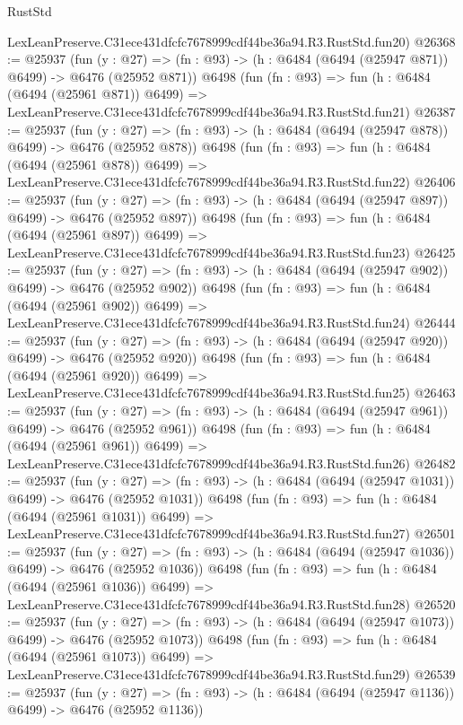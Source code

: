 \begin{lexlean}{RustStd}
\begin{coremodule}
    LexLeanPreserve.C31ece431dfcfc7678999cdf44be36a94.R3.RustStd.fun20)
@26368 := @25937
    (fun (y : @27) => (fn : @93) -> (h : @6484 (@6494 (@25947 @871)) @6499) -> @6476 (@25952 @871))
    @6498
    (fun (fn : @93) =>
    fun (h : @6484 (@6494 (@25961 @871)) @6499) =>
    LexLeanPreserve.C31ece431dfcfc7678999cdf44be36a94.R3.RustStd.fun21)
@26387 := @25937
    (fun (y : @27) => (fn : @93) -> (h : @6484 (@6494 (@25947 @878)) @6499) -> @6476 (@25952 @878))
    @6498
    (fun (fn : @93) =>
    fun (h : @6484 (@6494 (@25961 @878)) @6499) =>
    LexLeanPreserve.C31ece431dfcfc7678999cdf44be36a94.R3.RustStd.fun22)
@26406 := @25937
    (fun (y : @27) => (fn : @93) -> (h : @6484 (@6494 (@25947 @897)) @6499) -> @6476 (@25952 @897))
    @6498
    (fun (fn : @93) =>
    fun (h : @6484 (@6494 (@25961 @897)) @6499) =>
    LexLeanPreserve.C31ece431dfcfc7678999cdf44be36a94.R3.RustStd.fun23)
@26425 := @25937
    (fun (y : @27) => (fn : @93) -> (h : @6484 (@6494 (@25947 @902)) @6499) -> @6476 (@25952 @902))
    @6498
    (fun (fn : @93) =>
    fun (h : @6484 (@6494 (@25961 @902)) @6499) =>
    LexLeanPreserve.C31ece431dfcfc7678999cdf44be36a94.R3.RustStd.fun24)
@26444 := @25937
    (fun (y : @27) => (fn : @93) -> (h : @6484 (@6494 (@25947 @920)) @6499) -> @6476 (@25952 @920))
    @6498
    (fun (fn : @93) =>
    fun (h : @6484 (@6494 (@25961 @920)) @6499) =>
    LexLeanPreserve.C31ece431dfcfc7678999cdf44be36a94.R3.RustStd.fun25)
@26463 := @25937
    (fun (y : @27) => (fn : @93) -> (h : @6484 (@6494 (@25947 @961)) @6499) -> @6476 (@25952 @961))
    @6498
    (fun (fn : @93) =>
    fun (h : @6484 (@6494 (@25961 @961)) @6499) =>
    LexLeanPreserve.C31ece431dfcfc7678999cdf44be36a94.R3.RustStd.fun26)
@26482 := @25937
    (fun (y : @27) =>
    (fn : @93) -> (h : @6484 (@6494 (@25947 @1031)) @6499) -> @6476 (@25952 @1031))
    @6498
    (fun (fn : @93) =>
    fun (h : @6484 (@6494 (@25961 @1031)) @6499) =>
    LexLeanPreserve.C31ece431dfcfc7678999cdf44be36a94.R3.RustStd.fun27)
@26501 := @25937
    (fun (y : @27) =>
    (fn : @93) -> (h : @6484 (@6494 (@25947 @1036)) @6499) -> @6476 (@25952 @1036))
    @6498
    (fun (fn : @93) =>
    fun (h : @6484 (@6494 (@25961 @1036)) @6499) =>
    LexLeanPreserve.C31ece431dfcfc7678999cdf44be36a94.R3.RustStd.fun28)
@26520 := @25937
    (fun (y : @27) =>
    (fn : @93) -> (h : @6484 (@6494 (@25947 @1073)) @6499) -> @6476 (@25952 @1073))
    @6498
    (fun (fn : @93) =>
    fun (h : @6484 (@6494 (@25961 @1073)) @6499) =>
    LexLeanPreserve.C31ece431dfcfc7678999cdf44be36a94.R3.RustStd.fun29)
@26539 := @25937
    (fun (y : @27) =>
    (fn : @93) -> (h : @6484 (@6494 (@25947 @1136)) @6499) -> @6476 (@25952 @1136))

\end{coremodule}
\end{lexlean}

